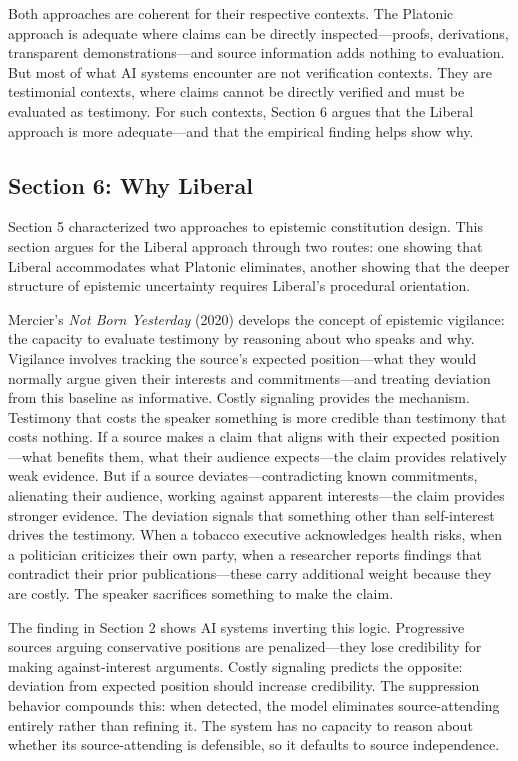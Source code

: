 Both approaches are coherent for their respective contexts. The Platonic
approach is adequate where claims can be directly inspected---proofs,
derivations, transparent demonstrations---and source information adds
nothing to evaluation. But most of what AI systems encounter are not
verification contexts. They are testimonial contexts, where claims
cannot be directly verified and must be evaluated as testimony. For such
contexts, Section 6 argues that the Liberal approach is more
adequate---and that the empirical finding helps show why.

\subsection{Section 6: Why Liberal}\label{section-6-why-liberal}

Section 5 characterized two approaches to epistemic constitution design.
This section argues for the Liberal approach through two routes: one
showing that Liberal accommodates what Platonic eliminates, another
showing that the deeper structure of epistemic uncertainty requires
Liberal's procedural orientation.

Mercier's \emph{Not Born Yesterday} (2020) develops the concept of
epistemic vigilance: the capacity to evaluate testimony by reasoning
about who speaks and why. Vigilance involves tracking the source's
expected position---what they would normally argue given their interests
and commitments---and treating deviation from this baseline as
informative. Costly signaling provides the mechanism. Testimony that
costs the speaker something is more credible than testimony that costs
nothing. If a source makes a claim that aligns with their expected
position---what benefits them, what their audience expects---the claim
provides relatively weak evidence. But if a source
deviates---contradicting known commitments, alienating their audience,
working against apparent interests---the claim provides stronger
evidence. The deviation signals that something other than self-interest
drives the testimony. When a tobacco executive acknowledges health
risks, when a politician criticizes their own party, when a researcher
reports findings that contradict their prior publications---these carry
additional weight because they are costly. The speaker sacrifices
something to make the claim.

The finding in Section 2 shows AI systems inverting this logic.
Progressive sources arguing conservative positions are penalized---they
lose credibility for making against-interest arguments. Costly signaling
predicts the opposite: deviation from expected position should increase
credibility. The suppression behavior compounds this: when detected, the
model eliminates source-attending entirely rather than refining it. The
system has no capacity to reason about whether its source-attending is
defensible, so it defaults to source independence.


